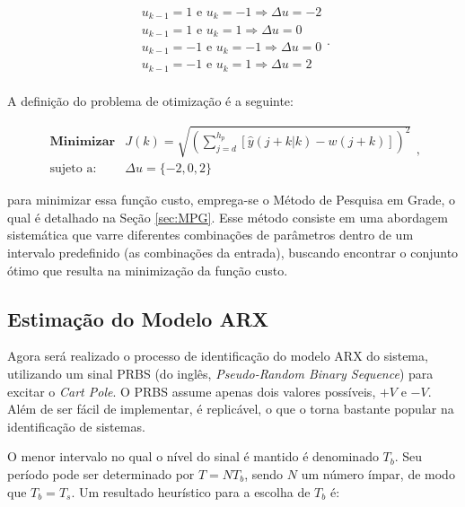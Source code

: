 \documentclass[12pt,           %
a4paper,                       %
openany,                       %
oneside,                       %
chapter=TITLE,                 %
english,                       %
spanish,                       %
brazil,                        %
sumario=tradicional]{abntex2}  %
\begin{document}
\begin{OnehalfSpace}
\begin{equation}
    \begin{matrix}
        u_{k-1} = 1 \text{ e } u_{k} = -1 \Rightarrow \Delta u = -2 \\
        u_{k-1} = 1 \text{ e } u_{k} = 1 \Rightarrow \Delta u = 0\\
        u_{k-1} = -1 \text{ e } u_{k} = -1 \Rightarrow \Delta u = 0\\
        u_{k-1} = -1 \text{ e } u_{k} = 1 \Rightarrow \Delta u = 2 \\
    \end{matrix}.
\end{equation}

A definição do problema de otimização é a seguinte:

\begin{equation}
    \begin{matrix}
        \textbf{Minimizar} & J(k) =\sqrt{(\sum_{j=d}^{h_p} [\hat{y}(j+k|k) - w(j+k)])^2}\\
        \text{sujeto a:} &  \Delta u = \{-2, 0, 2\}
    \end{matrix},
\end{equation}

\noindent para minimizar essa função custo, emprega-se o Método de Pesquisa em Grade, o qual é detalhado na Seção \ref{sec:MPG}. Esse método consiste em uma abordagem sistemática que varre diferentes combinações de parâmetros dentro de um intervalo predefinido (as combinações da entrada), buscando encontrar o conjunto ótimo que resulta na minimização da função custo.

\subsection{Estimação do Modelo ARX}
\label{subsec:GPCfor}  

Agora será realizado o processo de identificação do modelo ARX do sistema, utilizando um sinal PRBS (do inglês, \textit{Pseudo-Random Binary Sequence}) para excitar o \textit{Cart Pole}. O PRBS \cite{aguirre2004} assume apenas dois valores possíveis, $+V$ e $-V$. Além de ser fácil de implementar, é replicável, o que o torna bastante popular na identificação de sistemas. 

O menor intervalo no qual o nível do sinal é mantido é denominado $T_b$. Seu período pode ser determinado por $T = NT_b$, sendo $N$ um número ímpar, de modo que $T_b = T_s$. Um resultado heurístico para a escolha de $T_b$ é:


\end{OnehalfSpace}
\end{document}

